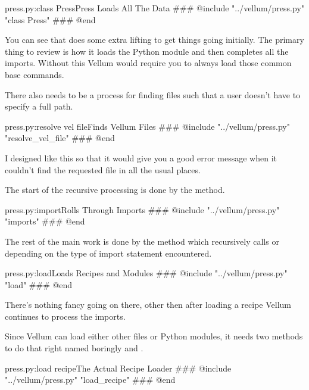 \begin{code}{press.py:class Press}{Press Loads All The Data}
### @include "../vellum/press.py" "class Press"
### @end
\end{code}

You can see that  does some extra lifting to get
things going initially.  The primary thing to review is how it loads the
 Python module and then completes all the imports.
Without this Vellum would require you to always load those common base commands.

There also needs to be a process for finding files such that a user doesn't have
to specify a full path.

\begin{code}{press.py:resolve vel file}{Finds Vellum Files}
### @include "../vellum/press.py" "resolve_vel_file"
### @end
\end{code}

I designed  like this so that it would give you a good
error message when it couldn't find the requested file in all the usual places.

The start of the recursive processing is done by the  method.

\begin{code}{press.py:import}{Rolls Through Imports}
### @include "../vellum/press.py" "imports"
### @end
\end{code}

The rest of the main work is done by the  method which recursively
calls  or  depending on the type of
import statement encountered.


\begin{code}{press.py:load}{Loads Recipes and Modules}
### @include "../vellum/press.py" "load"
### @end
\end{code}

There's nothing fancy going on there, other then after loading a recipe
Vellum continues to process the imports.

Since Vellum can load either other  files or Python modules, it
needs two methods to do that right named boringly  and
.


\begin{code}{press.py:load recipe}{The Actual Recipe Loader}
### @include "../vellum/press.py" "load_recipe"
### @end
\end{code}

